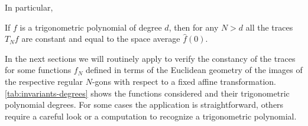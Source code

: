 In particular,
\begin{lemma} \label{:Laurent}
If $f$ is a trigonometric polynomial of degree $d$,
then for any $N>d$ all the traces $T_N f$ are constant and equal
to the space average $\widehat{f}(0)$.
\end{lemma}

In the next sections we will routinely apply  to verify
the constancy of the traces for some functions $f_N$
defined in terms of the Euclidean geometry
of the images of the respective regular $N$-gons
with respect to a fixed affine transformation.
\cref{tab:invariants-degrees} shows the functions considered and their trigonometric polynomial degrees.
For some cases the application is straightforward,
others require a careful look or a computation to recognize a trigonometric polynomial.


